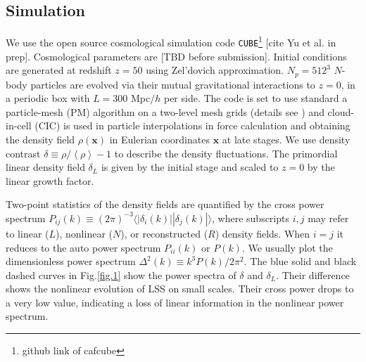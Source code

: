 \documentclass[aps,prd,twocolumn,superscriptaddress,amsfont,amssymb,amsmath,nofootinbib,showpacs,balancelastpage]{revtex4-1}
\newcommand{\bs}{\boldsymbol}
\newcommand{\lb}{\left\langle}
\newcommand{\rb}{\right\rangle}
\begin{document}
\subsection{Simulation}\label{ss.sim}
We use the open source cosmological simulation code {\tt CUBE}\footnote{github link of cafcube}
[cite Yu et al. in prep].
Cosmological parameters 
are [TBD before submission]. Initial conditions are generated at redshift $z=50$ 
using Zel'dovich approximation. $N_p=512^3$ $N$-body particles are evolved via 
their mutual gravitational interactions to $z=0$, in a periodic box with $L=300$ 
Mpc$/h$ per side. The code is set to use standard a particle-mesh (PM) algorithm 
\cite{1988csup.book.....H} on a two-level mesh grids
(details see \cite{2013MNRAS.436..540H}) and cloud-in-cell
(CIC) is used in particle interpolations in force 
calculation and obtaining the density field $\rho({\bs x})$ in Eulerian coordinates 
${\bs x}$ at late stages. We use density contrast $\delta\equiv\rho/\lb\rho\rb-1$ 
to describe the density fluctuations. The primordial linear density field $
\delta_L$ is given by the initial stage and scaled to $z=0$ by the linear growth 
factor.

Two-point statistics of the density fields are quantified by the cross power 
spectrum $P_{ij}(k)\equiv(2\pi)^{-3}\langle|\delta_i(k)||\delta_j(k)|\rangle$, 
where subscripts $i,j$ may refer to linear ($L$), nonlinear ($N$), or reconstructed ($R$) density 
fields. When $i=j$ it reduces to the auto power spectrum $P_{ii}(k)$ or $P(k)$. We 
usually plot the dimensionless power spectrum $\Delta^2(k)\equiv k^3P(k)/2\pi^2$. 
The blue solid and black dashed curves in Fig.\ref{fig.1} show the power spectra of 
$\delta$ and $\delta_L$. Their difference shows the nonlinear evolution of LSS on 
small scales. Their cross power drops to a very low value, indicating a loss of 
linear information in the nonlinear power spectrum.
\end{document}
